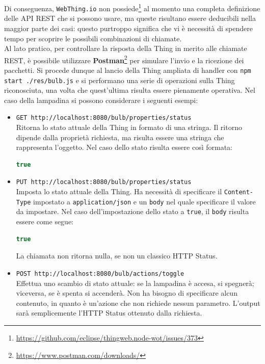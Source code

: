 \documentclass[12pt,a4paper,openright,oneside]{report}
\begin{document}
Di conseguenza, \texttt{WebThing.io} non possiede\footnote{\url{https://github.com/eclipse/thingweb.node-wot/issues/373}} al momento una completa definizione delle API REST che si possono usare, ma queste risultano essere deducibili nella maggior parte dei casi: questo purtroppo significa che vi è necessità di spendere tempo per scoprire le possibili combinazioni di chiamate.\\

Al lato pratico, per controllare la risposta della Thing in merito alle chiamate REST, è possibile utilizzare \textbf{Postman}\footnote{\url{https://www.postman.com/downloads/}} per simulare l'invio e la ricezione dei pacchetti. Si procede dunque al lancio della Thing ampliata di handler con \texttt{npm start ./res/bulb.js} e si performano una serie di operazioni sulla Thing riconosciuta, una volta che quest'ultima risulta essere pienamente operativa. Nel caso della lampadina si possono considerare i seguenti esempi:

\begin{itemize}
	\item \texttt{GET http://localhost:8080/bulb/properties/status}\\
	Ritorna lo stato attuale della Thing in formato di una stringa. Il ritorno dipende dalla proprietà richiesta, ma risulta essere una stringa che rappresenta l'oggetto. Nel caso dello stato risulta essere così formata:
	\begin{lstlisting}[language=JavaScript]
	  true
	\end{lstlisting}
	
	\item \texttt{PUT http://localhost:8080/bulb/properties/status}\\
	Imposta lo stato attuale della Thing. Ha necessità di specificare il \texttt{Content-Type} impostato a \texttt{application/json} e un \texttt{body} nel quale specificare il valore da impostare. Nel caso dell'impostazione dello stato a \texttt{true}, il \texttt{body} risulta essere come segue: 
	\begin{lstlisting}[language=JavaScript]
	  true
	\end{lstlisting}
	La chiamata non ritorna nulla, se non un classico HTTP Status.

	\item \texttt{POST http://localhost:8080/bulb/actions/toggle}\\
	Effettua uno scambio di stato attuale: se la lampadina è accesa, si spegnerà; viceversa, se è spenta si accenderà. Non ha bisogno di specificare alcun contenuto, in quanto è un'azione che non richiede nessun parametro. L'output sarà semplicemente l'HTTP Status ottenuto dalla richiesta.
\end{itemize}
\end{document}
